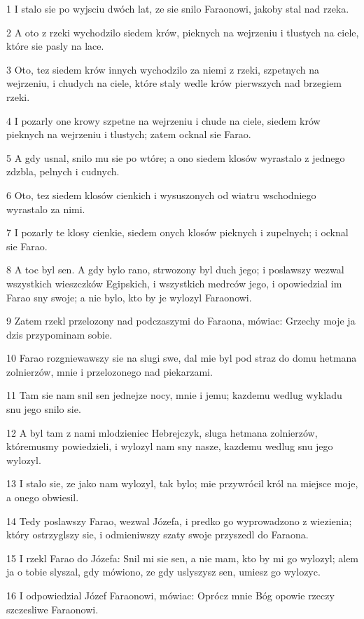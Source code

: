 \par 1 I stalo sie po wyjsciu dwóch lat, ze sie snilo Faraonowi, jakoby stal nad rzeka.
\par 2 A oto z rzeki wychodzilo siedem krów, pieknych na wejrzeniu i tlustych na ciele, które sie pasly na lace.
\par 3 Oto, tez siedem krów innych wychodzilo za niemi z rzeki, szpetnych na wejrzeniu, i chudych na ciele, które staly wedle krów pierwszych nad brzegiem rzeki.
\par 4 I pozarly one krowy szpetne na wejrzeniu i chude na ciele, siedem krów pieknych na wejrzeniu i tlustych; zatem ocknal sie Farao.
\par 5 A gdy usnal, snilo mu sie po wtóre; a ono siedem klosów wyrastalo z jednego zdzbla, pelnych i cudnych.
\par 6 Oto, tez siedem klosów cienkich i wysuszonych od wiatru wschodniego wyrastalo za nimi.
\par 7 I pozarly te klosy cienkie, siedem onych klosów pieknych i zupelnych; i ocknal sie Farao.
\par 8 A toc byl sen. A gdy bylo rano, strwozony byl duch jego; i poslawszy wezwal wszystkich wieszczków Egipskich, i wszystkich medrców jego, i opowiedzial im Farao sny swoje; a nie bylo, kto by je wylozyl Faraonowi.
\par 9 Zatem rzekl przelozony nad podczaszymi do Faraona, mówiac: Grzechy moje ja dzis przypominam sobie.
\par 10 Farao rozgniewawszy sie na slugi swe, dal mie byl pod straz do domu hetmana zolnierzów, mnie i przelozonego nad piekarzami.
\par 11 Tam sie nam snil sen jednejze nocy, mnie i jemu; kazdemu wedlug wykladu snu jego snilo sie.
\par 12 A byl tam z nami mlodzieniec Hebrejczyk, sluga hetmana zolnierzów, któremusmy powiedzieli, i wylozyl nam sny nasze, kazdemu wedlug snu jego wylozyl.
\par 13 I stalo sie, ze jako nam wylozyl, tak bylo; mie przywrócil król na miejsce moje, a onego obwiesil.
\par 14 Tedy poslawszy Farao, wezwal Józefa, i predko go wyprowadzono z wiezienia; który ostrzyglszy sie, i odmieniwszy szaty swoje przyszedl do Faraona.
\par 15 I rzekl Farao do Józefa: Snil mi sie sen, a nie mam, kto by mi go wylozyl; alem ja o tobie slyszal, gdy mówiono, ze gdy uslyszysz sen, umiesz go wylozyc.
\par 16 I odpowiedzial Józef Faraonowi, mówiac: Oprócz mnie Bóg opowie rzeczy szczesliwe Faraonowi.

